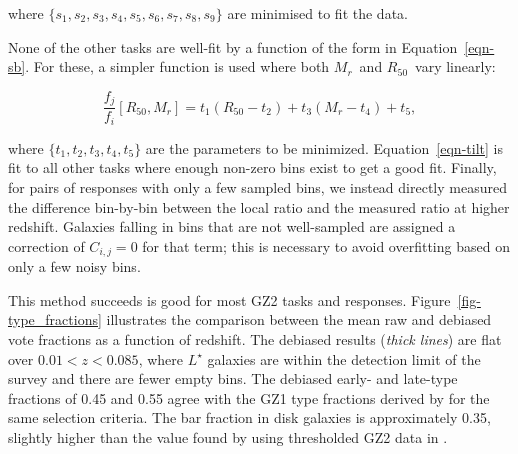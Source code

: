\documentclass[useAMS,usenatbib]{mn2e}
\newcommand{\mr}{$M_r$}
\newcommand{\rfifty}{$R_{50}$}
\begin{document}
\noindent where $\{s_1,s_2,s_3,s_4,s_5,s_6,s_7,s_8,s_9\}$ are minimised to fit the data. %

None of the other tasks are well-fit by a function of the form in Equation~\ref{eqn-sb}. For these, a simpler function is used where both \mr~and \rfifty~vary linearly:

\begin{equation}
\frac{f_j}{f_i}[R_{50},M_r] = t_1(R_{50} - t_2) + t_3(M_r - t_4) + t_5,
\label{eqn-tilt}
\end{equation}

\noindent where $\{t_1,t_2,t_3,t_4,t_5\}$ are the parameters to be minimized. Equation~\ref{eqn-tilt} is fit to all other tasks where enough non-zero bins exist to get a good fit. Finally, for pairs of responses with only a few sampled bins, we instead directly measured the difference bin-by-bin between the local ratio and the measured ratio at higher redshift. Galaxies falling in bins that are not well-sampled are assigned a correction of $C_{i,j}=0$ for that term; this is necessary to avoid overfitting based on only a few noisy bins. 



This method succeeds is good for most GZ2 tasks and responses. Figure~\ref{fig-type_fractions} illustrates the comparison between the mean raw and debiased vote fractions as a function of redshift. The debiased results ({\it thick lines}) are flat over $0.01<z<0.085$, where $L^\star$ galaxies \citep[$M_r\sim-20.44$;][]{bla03a} are within the detection limit of the survey and there are fewer empty bins. The debiased early- and late-type fractions of 0.45 and 0.55 agree with the GZ1 type fractions derived by \citet{bam09} for the same selection criteria. The bar fraction in disk galaxies is approximately 0.35, slightly higher than the value found by using thresholded GZ2 data in \citet{mas11c}.
\end{document}
